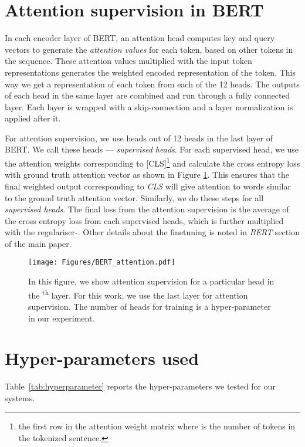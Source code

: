 \documentclass[letterpaper]{article} \usepackage{aaai21}  \usepackage{times}  \usepackage{helvet} \usepackage{courier}  \usepackage[hyphens]{url}  \usepackage{graphicx} \urlstyle{rm} \def\UrlFont{\rm}  \usepackage{natbib}  \usepackage{caption}
\begin{document}
\section{Attention supervision in BERT}

In each encoder layer of BERT, an attention head computes key and query vectors to generate the \textit{attention values} for each token, based on other tokens in the sequence.  These attention values multiplied with the input token representations generates the weighted encoded representation of the token. This way we get a representation of each token from each of the 12 heads. The outputs of each head in the same layer are combined and run through a fully connected layer. Each layer is wrapped with a skip-connection and a layer normalization is applied after it. 

For attention supervision, we use  heads out of 12 heads in the last layer of BERT. We call these heads --- \textit{supervised heads}. For each supervised head, we use the attention weights corresponding to [CLS]\footnote{the first row in the  attention weight matrix where  is the number of tokens in the tokenized sentence.} and calculate the cross entropy loss with ground truth attention vector as shown in Figure \ref{fig:bert_supervised}. This ensures that the final weighted output corresponding to \textit{CLS} will give attention to words similar to the ground truth attention vector. Similarly, we do these steps for all \textit{supervised heads}. The final loss from the attention supervision is the average of the cross entropy loss from each supervised heads, which is further multiplied with the regulariser-. Other details about the finetuning is noted in \textit{BERT} section of the main paper.

\begin{figure}[!tbh]
 \texttt{[image: Figures/BERT\_attention.pdf]}
 \caption{In this figure, we show attention supervision for a particular head in the \textsuperscript{th} layer. For this work, we use the last layer for attention supervision. The number of heads for training is a hyper-parameter in our experiment.} 
 \label{fig:bert_supervised}
\end{figure}


\section{Hyper-parameters used}

Table~\ref{tab:hyperparameter} reports the hyper-parameters we tested for our systems.
\end{document}

